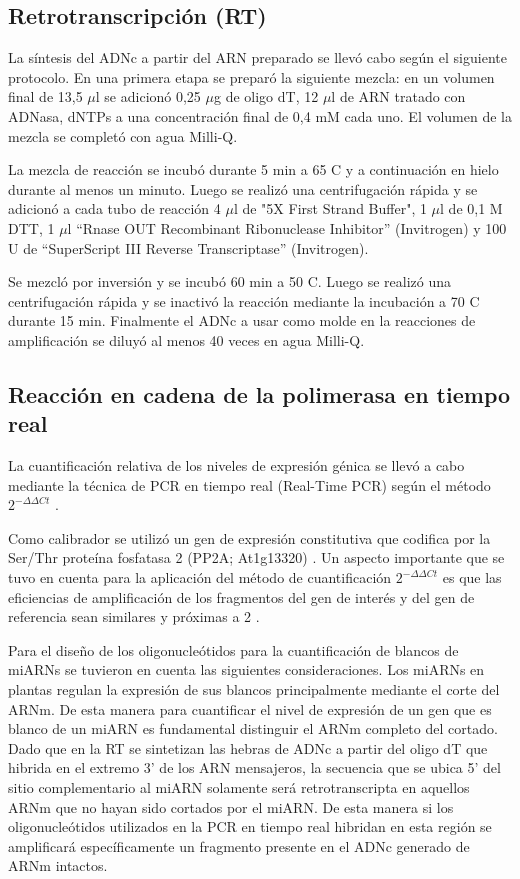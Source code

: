 \subsection{Retrotranscripción (RT)}
La síntesis del ADNc a partir del ARN preparado se llevó cabo según el siguiente protocolo.
En una primera etapa se preparó la siguiente mezcla: en un volumen final de 13,5 $\mu$l se adicionó 0,25 $\mu$g de oligo dT, 12 $\mu$l de ARN tratado con ADNasa, dNTPs a una concentración final de 0,4 mM cada uno.
El volumen de la mezcla se completó con agua Milli-Q.

La mezcla de reacción se incubó durante 5 min a 65 \degree C y a continuación en hielo durante al menos un minuto.
Luego se realizó una centrifugación rápida y se adicionó a cada tubo de reacción 4 $\mu$l de "5X First Strand Buffer", 1 $\mu$l de 0,1 M DTT, 1 $\mu$l “Rnase OUT Recombinant Ribonuclease Inhibitor” (Invitrogen) y 100 U de “SuperScript III Reverse Transcriptase” (Invitrogen).

Se mezcló por inversión y se incubó 60 min a 50 \degree C. Luego se realizó una centrifugación rápida y se inactivó la reacción mediante la incubación a 70 \degree C durante 15 min.
Finalmente el ADNc a usar como molde en la reacciones de amplificación se diluyó al menos 40 veces en agua Milli-Q.

\subsection{Reacción en cadena de la polimerasa en tiempo real}
La cuantificación relativa de los niveles de expresión génica se llevó a cabo mediante la técnica de PCR en tiempo real (Real-Time PCR) según el método $2^{-\Delta \Delta Ct}$ \citep{pmid11328886}.

Como calibrador se utilizó un gen de expresión constitutiva que codifica por la Ser/Thr proteína fosfatasa 2 (PP2A; At1g13320) \citep{pmid16166256}.
Un aspecto importante que se tuvo en cuenta para la aplicación del método de cuantificación $2^{- \Delta \Delta Ct}$ es que las eficiencias de amplificación de los fragmentos del gen de interés y del gen de referencia sean similares y próximas a 2 \citep{pmid11328886}.

Para el diseño de los oligonucleótidos para la cuantificación de blancos de miARNs se tuvieron en cuenta las siguientes consideraciones. 
Los miARNs en plantas regulan la expresión de sus blancos principalmente mediante el corte del ARNm. 
De esta manera para cuantificar el nivel de expresión de un gen que es blanco de un miARN es fundamental distinguir el ARNm completo del cortado.
Dado que en la RT se sintetizan las hebras de ADNc a partir del oligo dT que hibrida en el extremo 3' de los ARN mensajeros, la secuencia que se ubica 5' del sitio complementario al miARN solamente será retrotranscripta en aquellos ARNm que no hayan sido cortados por el miARN. 
De esta manera si los oligonucleótidos utilizados en la PCR en tiempo real hibridan en esta región se amplificará específicamente un fragmento presente en el ADNc generado de ARNm intactos.


